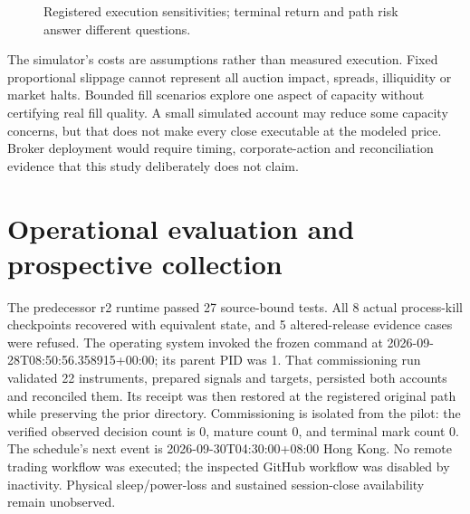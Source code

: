 \documentclass[11pt,a4paper]{article}
\begin{document}
\begin{figure}[htbp]

\caption{Registered execution sensitivities; terminal return and path risk answer different questions.}\label{fig:12}
\end{figure}

The simulator's costs are assumptions rather than measured execution. Fixed proportional slippage cannot represent all auction impact, spreads, illiquidity or market halts. Bounded fill scenarios explore one aspect of capacity without certifying real fill quality. A small simulated account may reduce some capacity concerns, but that does not make every close executable at the modeled price. Broker deployment would require timing, corporate-action and reconciliation evidence that this study deliberately does not claim.


\section{Operational evaluation and prospective collection}\label{sec:section-09}

The predecessor r2 runtime passed 27 source-bound tests. All 8 actual process-kill checkpoints recovered with equivalent state, and 5 altered-release evidence cases were refused. The operating system invoked the frozen command at 2026-09-28T08:50:56.358915+00:00; its parent PID was 1. That commissioning run validated 22 instruments, prepared signals and targets, persisted both accounts and reconciled them. Its receipt was then restored at the registered original path while preserving the prior directory. Commissioning is isolated from the pilot: the verified observed decision count is 0, mature count 0, and terminal mark count 0. The schedule's next event is 2026-09-30T04:30:00+08:00 Hong Kong. No remote trading workflow was executed; the inspected GitHub workflow was disabled by inactivity. Physical sleep/power-loss and sustained session-close availability remain unobserved.
\end{document}
